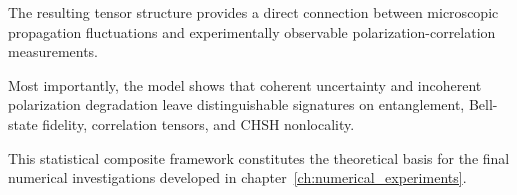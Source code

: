 \medskip

The resulting tensor structure provides a direct connection between microscopic propagation fluctuations and experimentally observable polarization-correlation measurements.

\medskip

Most importantly, the model shows that coherent uncertainty and incoherent polarization degradation leave distinguishable signatures on entanglement, Bell-state fidelity, correlation tensors, and CHSH nonlocality.

\medskip

This statistical composite framework constitutes the theoretical basis for the final numerical investigations developed in chapter~\ref{ch:numerical_experiments}.